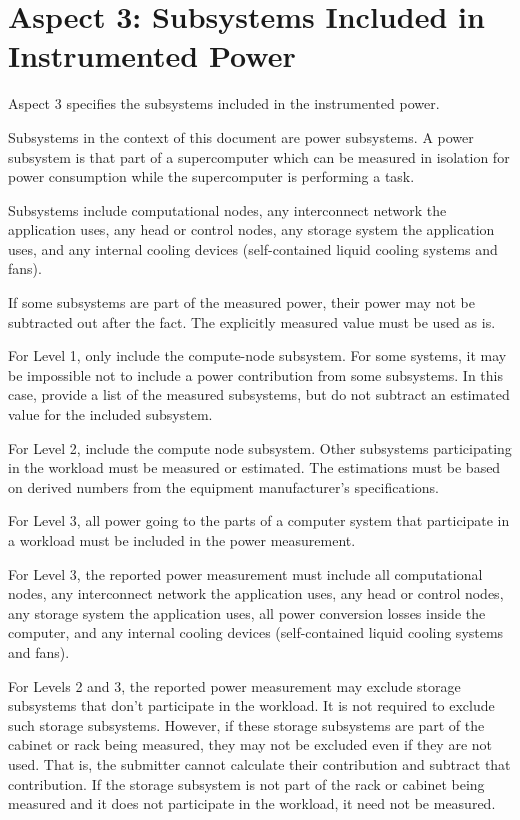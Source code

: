\section{Aspect 3: Subsystems Included in Instrumented Power}
\label{sec:A3SIiIP}
\noindent
Aspect 3 specifies the subsystems included in the instrumented power. 
\wl

\noindent
Subsystems in the context of this document are power subsystems. A power subsystem is that part of a supercomputer which can be measured in isolation for power consumption while the supercomputer is performing a task. 
\wl

\noindent
Subsystems include computational nodes, any interconnect network the application uses, any head or control nodes, any storage system the application uses, and any internal cooling devices (self-contained liquid cooling systems and fans).
\wl

\noindent
If some subsystems are part of the measured power, their power may not be subtracted out after the fact.  The explicitly measured value must be used as is.
\wl


\noindent
For Level 1, only include the compute-node subsystem. For some systems, it may be impossible not to include a power contribution from some subsystems. In this case, provide a list of the measured subsystems, but do not subtract an estimated value for the included subsystem. 
\wl

\noindent
For Level 2,  include the compute node subsystem. Other subsystems participating in the workload must be measured or estimated. The estimations must be based on derived numbers from the equipment manufacturer's specifications. 
\wl


\noindent
For Level 3, all power going to the parts of a computer system that participate in a workload must be included in the power measurement. 
\wl

\noindent
For Level 3, the reported power measurement must include all computational nodes, any interconnect network the application uses, any head or control nodes, any storage system the application uses, all power conversion losses inside the computer, and any internal cooling devices (self-contained liquid cooling systems and fans).  
\wl

\noindent
For Levels 2 and 3, the reported power measurement may exclude storage subsystems that don't participate in the workload. It is not required to exclude such storage subsystems. However, if these storage subsystems are part of the cabinet or rack being measured, they may not be excluded even if they are not used. That is, the submitter cannot calculate their contribution and subtract that contribution. If the storage subsystem is not part of the rack or cabinet being measured and it does not participate in the workload, it need not be measured.
\wl


